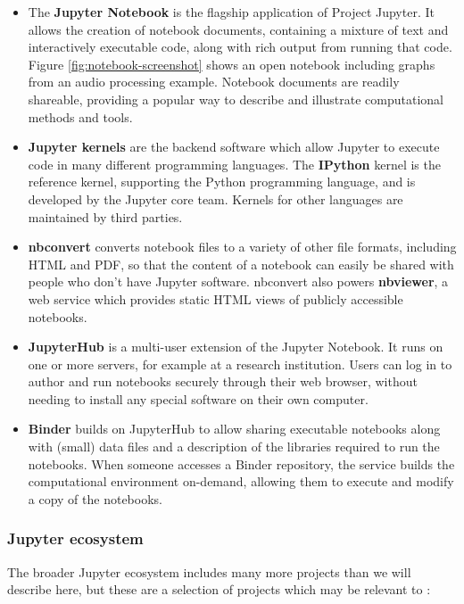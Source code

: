 \begin{itemize}
  \item The \textbf{Jupyter Notebook} is the flagship application of Project Jupyter.
  It allows the creation of notebook documents, containing a mixture of text and
  interactively executable code, along with rich output from running that code.
  Figure \ref{fig:notebook-screenshot} shows an open notebook including graphs
  from an audio processing example. Notebook documents are readily shareable,
  providing a popular way to describe and illustrate computational methods and
  tools.

  \item \textbf{Jupyter kernels} are the backend software which allow Jupyter to execute
  code in many different programming languages. The \textbf{IPython} kernel is
  the reference kernel, supporting the Python programming language, and is
  developed by the Jupyter core team. Kernels for other languages are maintained
  by third parties.

  \item \textbf{nbconvert} converts notebook files to a variety of other file
  formats, including HTML and PDF, so that the content of a notebook can easily
  be shared with people who don't have Jupyter software. nbconvert also powers
  \textbf{nbviewer}, a web service which provides static HTML views of publicly
  accessible notebooks.

  \item \textbf{JupyterHub} is a multi-user extension of the Jupyter Notebook.
  It runs on one or more servers, for example at a research institution.
  Users can log in to author and run notebooks securely through their web
  browser, without needing to install any special software on their own
  computer.

  \item \textbf{Binder} builds on JupyterHub to allow sharing executable
  notebooks along with (small) data files and a description of the libraries
  required to run the notebooks. When someone accesses a Binder repository,
  the service builds the computational environment on-demand, allowing them to
  execute and modify a copy of the notebooks.
\end{itemize}

\subsubsection{Jupyter ecosystem}

The broader Jupyter ecosystem includes many more projects than we will describe
here, but these are a selection of projects which may be relevant to
\TheProject:

